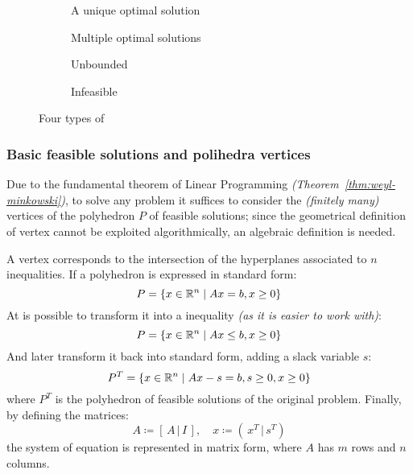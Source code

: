 \documentclass[english]{article}
\begin{document}
\begin{figure}[htbp]
  \bigskip
  \centering
  \begin{subfigure}[b]{0.495\textwidth}
    \bigskip
    \centering
    \caption{A unique optimal solution}
    \label{subfig:unique-solution}
    \bigskip
  \end{subfigure}
  \begin{subfigure}[b]{0.495\textwidth}
    \bigskip
    \centering
    \caption{Multiple optimal solutions}
    \label{subfig:multiple-solutions}
    \bigskip
  \end{subfigure}
  \bigskip
  \begin{subfigure}[b]{0.495\textwidth}
    \bigskip
    \centering
    \caption{Unbounded \LP}
    \label{subfig:unbounded-lp}
    \bigskip
  \end{subfigure}
  \begin{subfigure}[b]{0.495\textwidth}
    \bigskip
    \centering
    \caption{Infeasible \LP}
    \label{subfig:infeasible-lp}
    \bigskip
  \end{subfigure}
  \caption{Four types of \LP}
  \label{fig:lp-types}
  \bigskip
\end{figure}

\subsubsection{Basic feasible solutions and polihedra vertices}

Due to the fundamental theorem of Linear Programming \textit{(Theorem~\ref{thm:weyl-minkowski})}, to solve any \LP problem it suffices to consider the \textit{(finitely many)} vertices of the polyhedron \(P\) of feasible solutions;
since the geometrical definition of vertex cannot be exploited algorithmically, an algebraic definition is needed.

A vertex corresponds to the intersection of the hyperplanes associated to \(n\) inequalities.
If a polyhedron is expressed in standard form:
\[ P = \left\{ x \in \mathbb{R}^n \mid  Ax = b, x \geq 0 \right\}\]
At is possible to transform it into a inequality \textit{(as it is easier to work with)}:
\[ P = \left\{ x \in \mathbb{R}^n \mid  Ax \leq b, x \geq 0 \right\}\]
And later transform it back into standard form, adding a slack variable \(s\):
\[ P^T = \left\{ x \in \mathbb{R}^n \mid   Ax -s = b, s \geq 0, x \geq 0 \right\} \]
where \(P^T\) is the polyhedron of feasible solutions of the original problem.
Finally, by defining the matrices:
\[ A \coloneqq \left[ \, A \,|\, I \, \right], \quad x \coloneqq \left( \, x^T \,|\, s^T \right) \]
the system of equation is represented in matrix form, where \(A\) has \(m\) rows and \(n\) columns.
\end{document}
